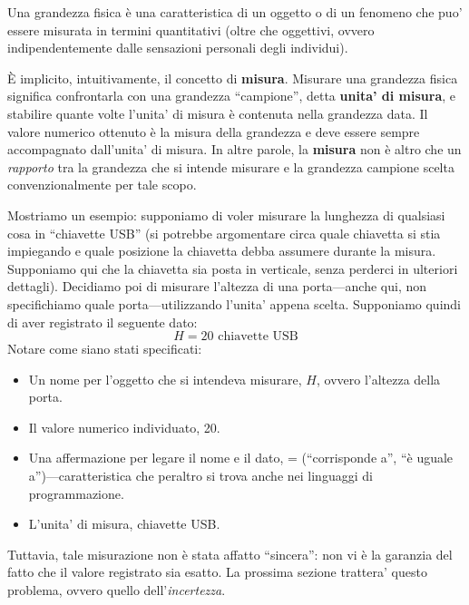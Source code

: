 \vspace{8pt}
\begin{tcolorbox}[colback = yellow!30, colframe = yellow!30!black, title = {Grandezza fisica}]
Una grandezza fisica è una caratteristica di un oggetto o di un fenomeno che puo'
essere misurata in termini quantitativi (oltre che oggettivi, ovvero indipendentemente
dalle sensazioni personali degli individui).
\end{tcolorbox}
\vspace{5pt}

È implicito, intuitivamente, il concetto di \textbf{misura}. Misurare una grandezza
fisica significa confrontarla con una grandezza ``campione'', detta \textbf{unita'
di misura}, e stabilire quante volte l'unita' di misura è contenuta nella
grandezza data. Il valore numerico ottenuto è la misura della grandezza e deve
essere sempre accompagnato dall'unita' di misura.
In altre parole, la \textbf{misura} non è altro che un \textit{rapporto} tra la
grandezza che si intende misurare e la grandezza campione scelta convenzionalmente
per tale scopo.

Mostriamo un esempio: supponiamo di voler misurare la lunghezza di qualsiasi cosa
in ``chiavette USB'' (si potrebbe argomentare circa quale chiavetta si stia
impiegando e quale posizione la chiavetta debba assumere durante la misura.
Supponiamo qui che la chiavetta sia posta in verticale, senza perderci in ulteriori
dettagli). Decidiamo poi di misurare l'altezza di una porta—anche qui, non
specifichiamo quale porta—utilizzando l'unita' appena scelta. Supponiamo quindi
di aver registrato il seguente dato:
\[ H = 20 \text{ chiavette USB} \]
Notare come siano stati specificati:
\begin{itemize}
    \item Un nome per l'oggetto che si intendeva misurare, $H$, ovvero l'altezza
    della porta.
    \item Il valore numerico individuato, 20.
    \item Una affermazione per legare il nome e il dato, = (``corrisponde a'', ``è
    uguale a'')—caratteristica che peraltro si trova anche nei linguaggi di
    programmazione.
    \item L'unita' di misura, chiavette USB.
\end{itemize}
Tuttavia, tale misurazione non è stata affatto ``sincera'': non vi è la
garanzia del fatto che il valore registrato sia esatto. La prossima sezione
trattera' questo problema, ovvero quello dell'\textit{incertezza}.


